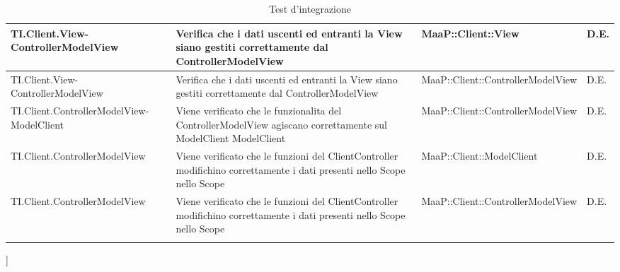 \begin{center}
\begin{longtable}{|p{5cm}|p{5cm}|p{5cm}|p{1cm}|}
\midrule
TI.Client.View-ControllerModelView
& Verifica che i dati uscenti ed entranti la View siano gestiti correttamente dal ControllerModelView
& MaaP::Client::View
& D.E.\\


\midrule
TI.Client.View-ControllerModelView
& Verifica che i dati uscenti ed entranti la View siano gestiti correttamente dal ControllerModelView
& MaaP::Client::ControllerModelView
& D.E.\\


\midrule
TI.Client.ControllerModelView-ModelClient
& Viene verificato che le funzionalita del ControllerModelView agiscano correttamente sul ModelClient
ModelClient
& MaaP::Client::ControllerModelView
& D.E.\\


\midrule
TI.Client.ControllerModelView
& Viene verificato che le funzioni del ClientController modifichino correttamente i dati presenti nello Scope
nello Scope
& MaaP::Client::ModelClient
& D.E.\\


\midrule
TI.Client.ControllerModelView
& Viene verificato che le funzioni del ClientController modifichino correttamente i dati presenti nello Scope
nello Scope
& MaaP::Client::ControllerModelView
& D.E.\\


\bottomrule
\caption{Test d'integrazione}
\end{longtable}
\end{center}
]

